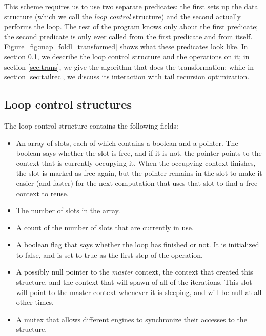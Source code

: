 This scheme requires us to use two separate predicates:
the first sets up the data structure
(which we call the \emph{loop control} structure)
and the second actually performs the loop.
The rest of the program knows only about the first predicate;
the second predicate is only ever called from the first predicate
and from itself.
Figure~\ref{fig:map_foldl_transformed} shows what these predicates look like.
In section \ref{sec:structs},
we describe the loop control structure and the operations on it;
in section \ref{sec:trans},
we give the algorithm that does the transformation;
while in section \ref{sec:tailrec},
we discuss its interaction with tail recursion optimization.

\subsection{Loop control structures}
\label{sec:structs}

The loop control structure contains the following fields:
\begin{itemize}
\item
An array of slots, each of which contains a boolean and a pointer.
The boolean says whether the slot is free,
and if it is not,
the pointer points to the context that is currently occupying it.
When the occupying context finishes,
the slot is marked as free again,
but the pointer remains in the slot
to make it easier (and faster) for the next computation that uses that slot
to find a free context to reuse.
\item
The number of slots in the array.
\item
A count of the number of slots that are currently in use.
\item
A boolean flag that says whether the loop has finished or not.
It is initialized to false, and is set to true
as the first step of the  operation.
\item
A possibly null pointer to the \emph{master} context,
the context that created this structure,
and the context that will spawn of all of the iterations.
This slot will point to the master context whenever it is sleeping,
and will be null at all other times.
\item
A mutex that allows different engines
to synchronize their accesses to the structure.
\end{itemize}

